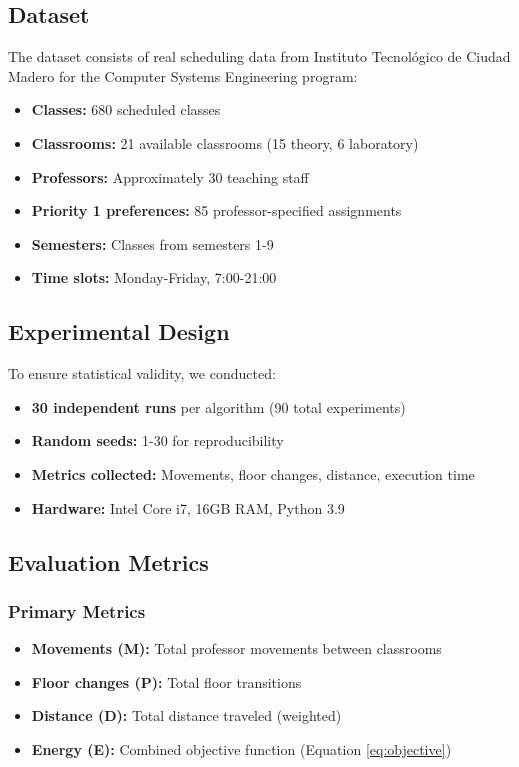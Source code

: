 \documentclass[algorithms,article,submit,pdftex,moreauthors]{Definitions/mdpi}
\begin{document}
\subsection{Dataset}

The dataset consists of real scheduling data from Instituto Tecnológico de Ciudad Madero for the Computer Systems Engineering program:

\begin{itemize}
\item \textbf{Classes:} 680 scheduled classes
\item \textbf{Classrooms:} 21 available classrooms (15 theory, 6 laboratory)
\item \textbf{Professors:} Approximately 30 teaching staff
\item \textbf{Priority 1 preferences:} 85 professor-specified assignments
\item \textbf{Semesters:} Classes from semesters 1-9
\item \textbf{Time slots:} Monday-Friday, 7:00-21:00
\end{itemize}

\subsection{Experimental Design}

To ensure statistical validity, we conducted:

\begin{itemize}
\item \textbf{30 independent runs} per algorithm (90 total experiments)
\item \textbf{Random seeds:} 1-30 for reproducibility
\item \textbf{Metrics collected:} Movements, floor changes, distance, execution time
\item \textbf{Hardware:} Intel Core i7, 16GB RAM, Python 3.9
\end{itemize}

\subsection{Evaluation Metrics}

\subsubsection{Primary Metrics}

\begin{itemize}
\item \textbf{Movements (M):} Total professor movements between classrooms
\item \textbf{Floor changes (P):} Total floor transitions
\item \textbf{Distance (D):} Total distance traveled (weighted)
\item \textbf{Energy (E):} Combined objective function (Equation \ref{eq:objective})
\end{itemize}
\end{document}

